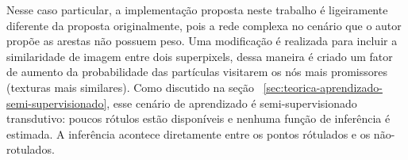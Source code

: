 Nesse caso particular, a implementação proposta neste trabalho é
ligeiramente diferente da proposta originalmente, pois a rede complexa
no cenário que o autor propõe as arestas não possuem peso. Uma
modificação é realizada para incluir a similaridade de imagem entre
dois superpixels, dessa maneira é criado um fator de aumento da
probabilidade das partículas visitarem os nós mais promissores
(texturas mais similares). Como discutido na seção
~\ref{sec:teorica-aprendizado-semi-supervisionado}, esse cenário de
aprendizado é semi-supervisionado transdutivo: poucos rótulos estão
disponíveis e nenhuma função de inferência é estimada. A inferência
acontece diretamente entre os pontos rótulados e os não-rotulados.


\begin{figure}[!h]
\centering
    \captionsetup{width=14cm}

    \begin{subfigure}[b]{0.45\textwidth}
    \centering
    \caption{\label{fig:lcu-partial}}
    \end{subfigure}
\quad
    \begin{subfigure}[b]{0.45\textwidth}
    \centering
    \caption{\label{fig:lcu-done}}
    \end{subfigure}
    {\Fonte{\fontefigura}}
\quad
\end{figure}
\FloatBarrier{}


